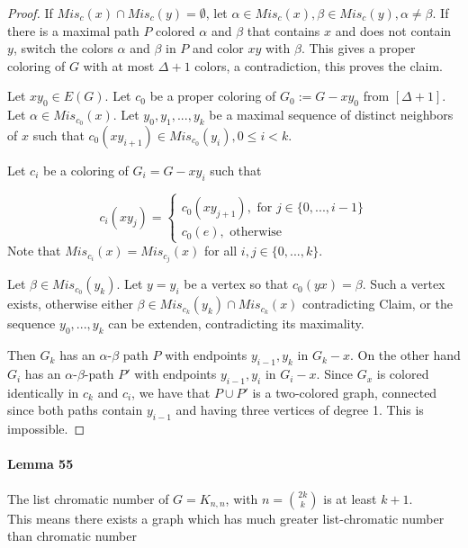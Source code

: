 \begin{proof}
    \smallskip 
    If $Mis_c(x) \cap Mis_c(y) = \emptyset$, let $\alpha \in Mis_c(x), \beta
    \in Mis_c(y), \alpha \neq \beta$. If there is a maximal path $P$ colored
    $\alpha$ and $\beta$ that contains $x$ and does not contain $y$, switch the 
    colors $\alpha$ and $\beta$ in $P$ and color $xy$ with $\beta$. This gives
    a proper coloring of $G$ with at most $\Delta+1$ colors, a contradiction,
    this proves the claim.

    \bigskip
    Let $xy_0 \in E(G)$. Let $c_0$ be a proper coloring of $G_0 := G - xy_0$
    from $[\Delta + 1]$. Let $\alpha \in Mis_{c_0}(x)$. Let $y_0,y_1,...,y_k$
    be a maximal sequence of distinct neighbors of $x$ such that 
    $c_0(xy_{i+1}) \in Mis_{c_0}(y_i), 0 \leq i < k$.

    \bigskip
    Let $c_i$ be a coloring of $G_i = G-xy_i$ such that 

    $$c_i(xy_j) = 
        \begin{cases}
            c_0(xy_{j+1}), \text{ for } j \in \{0,...,i-1\} \\
            c_0(e), \text{ otherwise}
        \end{cases}
    $$
    Note that $Mis_{c_i}(x) = Mis_{c_j}(x)$ for all $i,j \in \{0,...,k\}$.

    \smallskip
    Let $\beta \in Mis_{c_0}(y_k)$. Let $y = y_i$ be a vertex so that 
    $c_0(yx) = \beta$. Such a vertex exists, otherwise either 
    $\beta \in Mis_{c_k}(y_k) \cap Mis_{c_k}(x)$ contradicting Claim, or the 
    sequence $y_0,...,y_k$ can be extenden, contradicting its maximality.

    \smallskip
    Then $G_k$ has an $\alpha$-$\beta$ path $P$ with endpoints $y_{i-1},y_k$
    in $G_k -x$. On the other hand $G_i$ has an $\alpha$-$\beta$-path $P'$
    with endpoints $y_{i-1},y_i$ in $G_i -x$. Since $G_x$ is colored identically
    in $c_k$ and $c_i$, we have that $P \cup P'$ is a two-colored graph,
    connected since both paths contain $y_{i-1}$ and having three vertices 
    of degree 1. This is impossible.
\end{proof}

\paragraph{Lemma 55} 
The list chromatic number of $ G = K_{n,n} $, with $n = \binom{2k}{k}$ 
is at least $k+1$.
\\
This means there exists a graph which has much greater list-chromatic 
number than chromatic number
